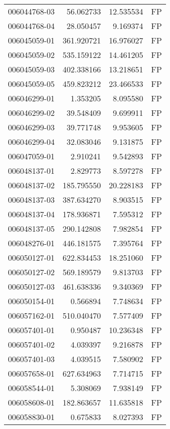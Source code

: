 \begin{tabular}{lrrl}
006044768-03 &   56.062733 &    12.535534 &   FP \\
006044768-04 &   28.050457 &     9.169374 &   FP \\
006045059-01 &  361.920721 &    16.976027 &   FP \\
006045059-02 &  535.159122 &    14.461205 &   FP \\
006045059-03 &  402.338166 &    13.218651 &   FP \\
006045059-05 &  459.823212 &    23.466533 &   FP \\
006046299-01 &    1.353205 &     8.095580 &   FP \\
006046299-02 &   39.548409 &     9.699911 &   FP \\
006046299-03 &   39.771748 &     9.953605 &   FP \\
006046299-04 &   32.083046 &     9.131875 &   FP \\
006047059-01 &    2.910241 &     9.542893 &   FP \\
006048137-01 &    2.829773 &     8.597278 &   FP \\
006048137-02 &  185.795550 &    20.228183 &   FP \\
006048137-03 &  387.634270 &     8.903515 &   FP \\
006048137-04 &  178.936871 &     7.595312 &   FP \\
006048137-05 &  290.142808 &     7.982854 &   FP \\
006048276-01 &  446.181575 &     7.395764 &   FP \\
006050127-01 &  622.834453 &    18.251060 &   FP \\
006050127-02 &  569.189579 &     9.813703 &   FP \\
006050127-03 &  461.638336 &     9.340369 &   FP \\
006050154-01 &    0.566894 &     7.748634 &   FP \\
006057162-01 &  510.040470 &     7.577409 &   FP \\
006057401-01 &    0.950487 &    10.236348 &   FP \\
006057401-02 &    4.039397 &     9.216878 &   FP \\
006057401-03 &    4.039515 &     7.580902 &   FP \\
006057658-01 &  627.634963 &     7.714715 &   FP \\
006058544-01 &    5.308069 &     7.938149 &   FP \\
006058608-01 &  182.863657 &    11.635818 &   FP \\
006058830-01 &    0.675833 &     8.027393 &   FP \\

\end{tabular}
